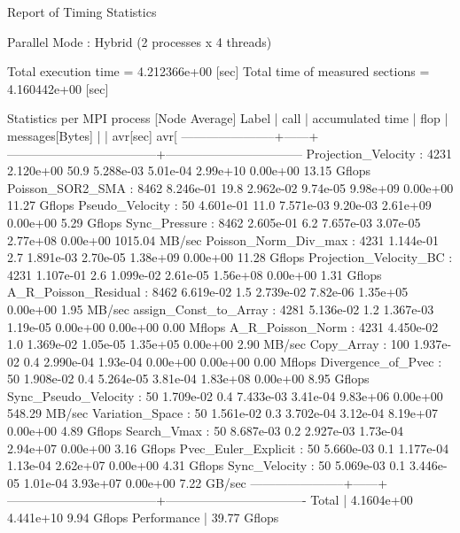 {\small
\begin{program}
Report of Timing Statistics

Parallel Mode                    :   Hybrid (2 processes x 4 threads)

Total execution time            = 4.212366e+00 [sec]
Total time of measured sections = 4.160442e+00 [sec]

Statistics per MPI process [Node Average]
Label                  | call |            accumulated time        |         flop | messages[Bytes]
                       |      |  avr[sec] avr[%
-----------------------+------+------------------------------------+---------------------------------
Projection_Velocity    : 4231   2.120e+00  50.9 5.288e-03 5.01e-04  2.99e+10  0.00e+00   13.15 Gflops
Poisson_SOR2_SMA       : 8462   8.246e-01  19.8 2.962e-02 9.74e-05  9.98e+09  0.00e+00   11.27 Gflops
Pseudo_Velocity        :   50   4.601e-01  11.0 7.571e-03 9.20e-03  2.61e+09  0.00e+00    5.29 Gflops
Sync_Pressure          : 8462   2.605e-01   6.2 7.657e-03 3.07e-05  2.77e+08  0.00e+00 1015.04 MB/sec
Poisson_Norm_Div_max   : 4231   1.144e-01   2.7 1.891e-03 2.70e-05  1.38e+09  0.00e+00   11.28 Gflops
Projection_Velocity_BC : 4231   1.107e-01   2.6 1.099e-02 2.61e-05  1.56e+08  0.00e+00    1.31 Gflops
A_R_Poisson_Residual   : 8462   6.619e-02   1.5 2.739e-02 7.82e-06  1.35e+05  0.00e+00    1.95 MB/sec
assign_Const_to_Array  : 4281   5.136e-02   1.2 1.367e-03 1.19e-05  0.00e+00  0.00e+00    0.00 Mflops
A_R_Poisson_Norm       : 4231   4.450e-02   1.0 1.369e-02 1.05e-05  1.35e+05  0.00e+00    2.90 MB/sec
Copy_Array             :  100   1.937e-02   0.4 2.990e-04 1.93e-04  0.00e+00  0.00e+00    0.00 Mflops
Divergence_of_Pvec     :   50   1.908e-02   0.4 5.264e-05 3.81e-04  1.83e+08  0.00e+00    8.95 Gflops
Sync_Pseudo_Velocity   :   50   1.709e-02   0.4 7.433e-03 3.41e-04  9.83e+06  0.00e+00  548.29 MB/sec
Variation_Space        :   50   1.561e-02   0.3 3.702e-04 3.12e-04  8.19e+07  0.00e+00    4.89 Gflops
Search_Vmax            :   50   8.687e-03   0.2 2.927e-03 1.73e-04  2.94e+07  0.00e+00    3.16 Gflops
Pvec_Euler_Explicit    :   50   5.660e-03   0.1 1.177e-04 1.13e-04  2.62e+07  0.00e+00    4.31 Gflops
Sync_Velocity          :   50   5.069e-03   0.1 3.446e-05 1.01e-04  3.93e+07  0.00e+00    7.22 GB/sec
-----------------------+------+------------------------------------+----------------------------------
Total                  |        4.1604e+00                             4.441e+10           9.94 Gflops
   Performance         |                                                                  39.77 Gflops
\end{program}
}

